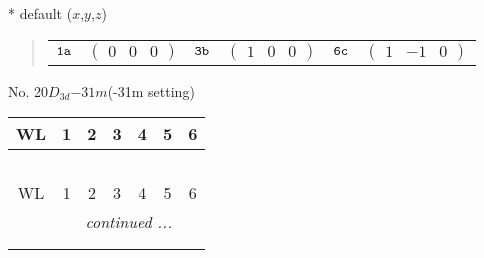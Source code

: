\documentclass[fleqn,9pt,landscape]{jsarticle}
\begin{document}
* default ($x$,$y$,$z$)
\begin{quote}
\begin{tabular}{cccccc}
$ {\tt 1a} $ & $ \begin{pmatrix} 0 & 0 & 0 \end{pmatrix} $ & $ {\tt 3b} $ & $ \begin{pmatrix} 1 & 0 & 0 \end{pmatrix} $ & $ {\tt 6c} $ & $ \begin{pmatrix} 1 & -1 & 0 \end{pmatrix} $
\end{tabular}
\end{quote}
\newpage
No. 20\quad$D_{3d}$\quad$-31m$\quad(-31m setting)\quad[ trigonal ]
\begin{center}
\renewcommand{\arraystretch}{1.2}
\begin{longtable}{ccccccc}
 \hline \hline
WL & 1 & 2 & 3 & 4 & 5 & 6 \\ \hline \endfirsthead

\multicolumn{6}{l}{\tablename\ \thetable{}} \\
 \hline \hline
WL & 1 & 2 & 3 & 4 & 5 & 6 \\ \hline \endhead

 \hline \hline
\multicolumn{6}{r}{\footnotesize\it continued ...} \\ \endfoot

 \hline \hline
\multicolumn{6}{r}{} \\ \endlastfoot


\end{longtable}
\end{center}
\end{document}
